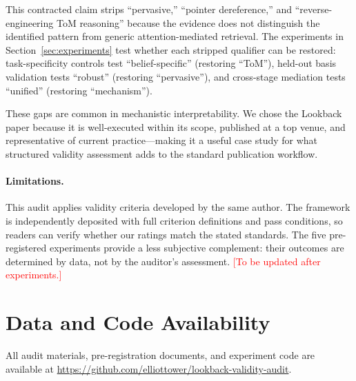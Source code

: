 \documentclass[11pt]{article}
\begin{document}
This contracted claim strips ``pervasive,'' ``pointer dereference,'' and ``reverse-engineering ToM reasoning'' because the evidence does not distinguish the identified pattern from generic attention-mediated retrieval. The experiments in Section~\ref{sec:experiments} test whether each stripped qualifier can be restored: task-specificity controls test ``belief-specific'' (restoring ``ToM''), held-out basis validation tests ``robust'' (restoring ``pervasive''), and cross-stage mediation tests ``unified'' (restoring ``mechanism'').

These gaps are common in mechanistic interpretability. We chose the Lookback paper because it is well-executed within its scope, published at a top venue, and representative of current practice---making it a useful case study for what structured validity assessment adds to the standard publication workflow.

\paragraph{Limitations.}
This audit applies validity criteria developed by the same author. The framework is independently deposited with full criterion definitions and pass conditions, so readers can verify whether our ratings match the stated standards. The five pre-registered experiments provide a less subjective complement: their outcomes are determined by data, not by the auditor's assessment. \textcolor{red}{[To be updated after experiments.]}


\section*{Data and Code Availability}

All audit materials, pre-registration documents, and experiment code are available at \url{https://github.com/elliottower/lookback-validity-audit}.




\end{document}
